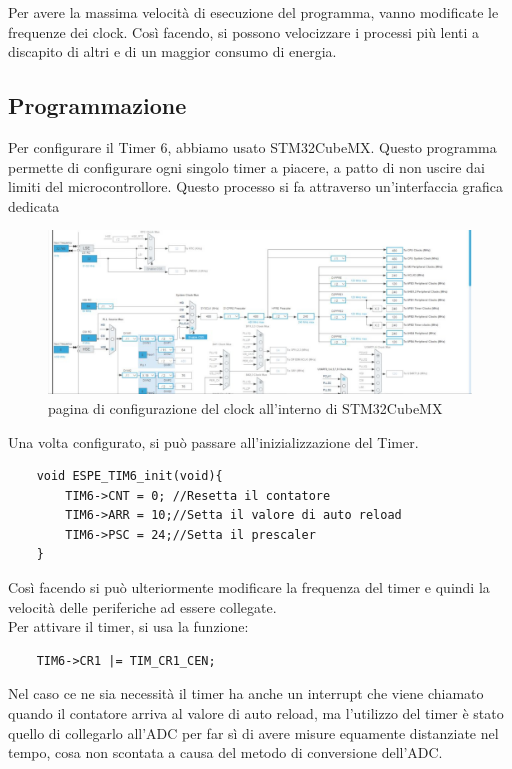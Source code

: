 Per avere la massima velocità di esecuzione del programma, vanno modificate le frequenze dei clock. Così facendo, si possono velocizzare i processi più lenti a discapito di altri e di un maggior consumo di energia.\\

\subsection{Programmazione}
Per configurare il Timer 6, abbiamo usato STM32CubeMX. Questo programma permette di configurare ogni singolo timer a piacere, a patto di non uscire dai limiti del microcontrollore. Questo processo si fa attraverso un'interfaccia grafica dedicata

\begin{figure}
    \centering
    \includegraphics[width=0.7\linewidth]{microcontrollore/assets/clock_config.jpg}
    \caption{pagina di configurazione del clock all'interno di STM32CubeMX}
    \label{fig:Timer}
\end{figure}
 
Una volta configurato, si può passare all'inizializzazione del Timer.

\begin{verbatim}
    void ESPE_TIM6_init(void){
        TIM6->CNT = 0; //Resetta il contatore
        TIM6->ARR = 10;//Setta il valore di auto reload
        TIM6->PSC = 24;//Setta il prescaler
    }
\end{verbatim}

Così facendo si può ulteriormente modificare la frequenza del timer e quindi la velocità delle periferiche ad essere collegate.\\
Per attivare il timer, si usa la funzione:
\begin{verbatim}
    TIM6->CR1 |= TIM_CR1_CEN;
\end{verbatim}

Nel caso ce ne sia necessità il timer ha anche un interrupt che viene chiamato quando il contatore arriva al valore di auto reload, ma l'utilizzo del timer è stato quello di collegarlo all'ADC per far sì di avere misure equamente distanziate nel tempo, cosa non scontata a causa del metodo di conversione dell'ADC.\\